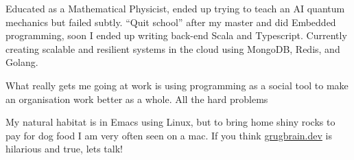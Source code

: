

Educated as a Mathematical Physicist, ended up trying to teach an AI
quantum mechanics but failed subtly. ``Quit school'' after my master
and did Embedded programming, soon I ended up writing back-end Scala
and Typescript. Currently creating scalable and resilient systems in
the cloud using MongoDB, Redis, and Golang.

What really gets me going at work is using programming as a social
tool to make an organisation work better as a whole. All the hard problems 

My natural habitat is in Emacs using Linux, but to bring home shiny
rocks to pay for dog food I am very often seen on a mac. If you think
\href{https://grugbrain.dev}{grugbrain.dev} is hilarious and true,
lets talk!
